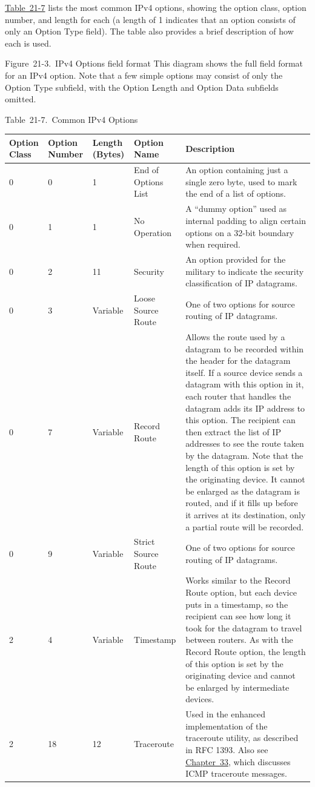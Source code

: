 \protect\hyperlink{ch21s03.htmlux5cux23common_ipv_options}{Table~21-7}
lists the most common IPv4 options, showing the option class, option
number, and length for each (a length of 1 indicates that an option
consists of only an Option Type field). The table also provides a brief
description of how each is used.





Figure~21-3.~IPv4 Options field format This diagram shows the full field
format for an IPv4 option. Note that a few simple options may consist of
only the Option Type subfield, with the Option Length and Option Data
subfields omitted.



Table~21-7.~Common IPv4 Options

\begin{longtable}[]{@{}lllll@{}}
\toprule
Option Class & Option Number & Length (Bytes) & Option Name &
Description\tabularnewline
\midrule
\endhead
0 & 0 & 1 & End of Options List & An option containing just a single
zero byte, used to mark the end of a list of options.\tabularnewline
0 & 1 & 1 & No Operation & A ``dummy option'' used as internal padding to
align certain options on a 32-bit boundary when required.\tabularnewline
0 & 2 & 11 & Security & An option provided for the military to indicate
the security classification of IP datagrams.\tabularnewline
0 & 3 & Variable & Loose Source Route & One of two options for source
routing of IP datagrams.\tabularnewline
0 & 7 & Variable & Record Route & Allows the route used by a datagram to
be recorded within the header for the datagram itself. If a source
device sends a datagram with this option in it, each router that handles
the datagram adds its IP address to this option. The recipient can then
extract the list of IP addresses to see the route taken by the datagram.
Note that the length of this option is set by the originating device. It
cannot be enlarged as the datagram is routed, and if it fills up before
it arrives at its destination, only a partial route will be
recorded.\tabularnewline
0 & 9 & Variable & Strict Source Route & One of two options for source
routing of IP datagrams.\tabularnewline
2 & 4 & Variable & Timestamp & Works similar to the Record Route option,
but each device puts in a timestamp, so the recipient can see how long
it took for the datagram to travel between routers. As with the Record
Route option, the length of this option is set by the originating device
and cannot be enlarged by intermediate devices.\tabularnewline
2 & 18 & 12 & Traceroute & Used in the enhanced implementation of the
traceroute utility, as described in RFC 1393. Also see
\protect\hyperlink{ch33.html}{Chapter~33}, which discusses ICMP
traceroute messages.\tabularnewline
\bottomrule
\end{longtable}


